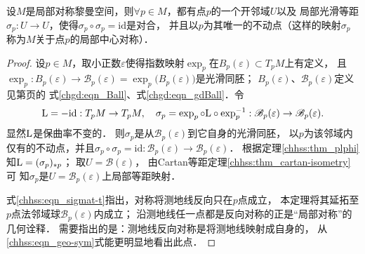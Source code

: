 \begin{theorem}\label{chhss:thm_lsg}
    设$M$是局部对称黎曼空间，则$\forall p \in M$，都有点$p$的一个开邻域$U$以及
    局部光滑等距$\sigma_p: U \rightarrow U$，使得$\sigma_p \circ \sigma_p=\mathrm{id}$是对合，
    并且以$p$为其唯一的不动点（这样的映射$\sigma_p$称为$M$关于点$p$的{\heiti 局部中心对称}）．
\end{theorem}
\begin{proof}
    设$p \in M$，取小正数$\varepsilon$使得指数映射$\exp_p$在$B_p(\varepsilon)\subset T_p M$上有定义，
    且$\exp_p: B_p(\varepsilon) \to \mathscr{B}_p(\varepsilon)=\exp_p\bigl(B_p(\varepsilon)\bigr)$是光滑同胚；
    $B_p(\varepsilon)$、$\mathscr{B}_p(\varepsilon)$定义见第\pageref{chgd:eqn_Ball}页的
    式\eqref{chgd:eqn_Ball}、式\eqref{chgd:eqn_gdBall}．令
    \begin{equation}
        {\rm L}=-\mathrm{id}: T_p M \to T_p M, \quad 
        \sigma_p=\exp _p \circ {\rm L} \circ \exp _p^{-1}:
        \mathscr{B}_p(\varepsilon) \to \mathscr{B}_p(\varepsilon) .
    \end{equation}
    显然${\rm L}$是保曲率不变的．
    则$\sigma_p$是从$\mathscr{B}_p(\varepsilon)$到它自身的光滑同胚，
    以$p$为该邻域内仅有的不动点，并且$\sigma_p \circ \sigma_p=\mathrm{id}:
    \mathscr{B}_p(\varepsilon) \rightarrow \mathscr{B}_p(\varepsilon)$．
    根据定理\ref{chhss:thm_plphi}知${\rm L}= (\sigma_p)_{*p}$；
    取$U=\mathscr{B}(\varepsilon)$，
    由Cartan等距定理\ref{chhss:thm_cartan-isometry}可
    知$\sigma_p$是$U=\mathscr{B}_p(\varepsilon)$上局部等距映射．
    
    {\kaishu 
    式\eqref{chhss:eqn_sigmat-t}指出，对称将测地线反向只在$p$点成立，
    本定理将其延拓至$p$点法邻域球$\mathscr{B}_p(\varepsilon)$内成立；
    沿测地线任一点都是反向对称的正是“局部对称”的几何诠释．
    需要指出的是：测地线反向对称是将测地线映射成自身的，
    从\eqref{chhss:eqn_geo-sym}式能更明显地看出此点．}
\end{proof}



